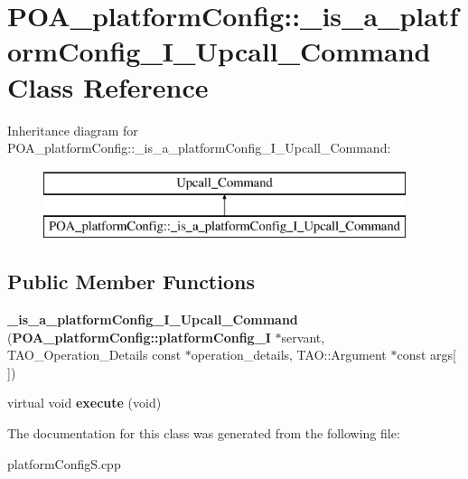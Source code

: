 \section{P\+O\+A\+\_\+platform\+Config\+:\+:\+\_\+is\+\_\+a\+\_\+platform\+Config\+\_\+\+I\+\_\+\+Upcall\+\_\+\+Command Class Reference}
\label{classPOA__platformConfig_1_1__is__a__platformConfig__I__Upcall__Command}
Inheritance diagram for P\+O\+A\+\_\+platform\+Config\+:\+:\+\_\+is\+\_\+a\+\_\+platform\+Config\+\_\+\+I\+\_\+\+Upcall\+\_\+\+Command\+:\begin{figure}[H]
\begin{center}
\leavevmode
\includegraphics[height=2.000000cm]{classPOA__platformConfig_1_1__is__a__platformConfig__I__Upcall__Command}
\end{center}
\end{figure}
\subsection*{Public Member Functions}
\begin{DoxyCompactItemize}
\item 
{\bfseries \+\_\+is\+\_\+a\+\_\+platform\+Config\+\_\+\+I\+\_\+\+Upcall\+\_\+\+Command} ({\bf P\+O\+A\+\_\+platform\+Config\+::platform\+Config\+\_\+I} $\ast$servant, T\+A\+O\+\_\+\+Operation\+\_\+\+Details const $\ast$operation\+\_\+details, T\+A\+O\+::\+Argument $\ast$const args[$\,$])\label{classPOA__platformConfig_1_1__is__a__platformConfig__I__Upcall__Command_a20bb826cd27bd29d838f14efada7cf78}

\item 
virtual void {\bfseries execute} (void)\label{classPOA__platformConfig_1_1__is__a__platformConfig__I__Upcall__Command_af81f574ee2c4fed97d9bb484601d3114}

\end{DoxyCompactItemize}


The documentation for this class was generated from the following file\+:\begin{DoxyCompactItemize}
\item 
platform\+Config\+S.\+cpp\end{DoxyCompactItemize}
